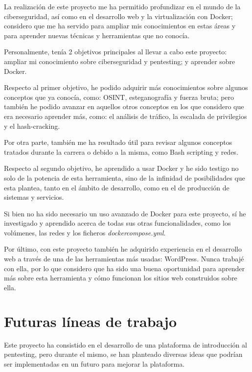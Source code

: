         La realización de este proyecto me ha permitido profundizar en el mundo de la ciberseguridad, así como en el desarrollo web y la virtualización con Docker; considero que me ha servido para ampliar mis conocimientos en estas áreas y para aprender nuevas técnicas y herramientas que no conocía.
    
        Personalmente, tenía 2 objetivos principales al llevar a cabo este proyecto: ampliar mi conocimiento sobre ciberseguridad y pentesting; y aprender sobre Docker.

        Respecto al primer objetivo, he podido adquirir más conocimientos sobre algunos conceptos que ya conocía, como: OSINT, esteganografía y fuerza bruta; pero también he podido avanzar en aquellos otros conceptos en los que considero que era necesario aprender más, como: el análisis de tráfico, la escalada de privilegios y el hash-cracking.
        
        Por otra parte, también me ha resultado útil para revisar algunos conceptos tratados durante la carrera o debido a la misma, como Bash scripting y redes.

        Respecto al segundo objetivo, he aprendido a usar Docker y he sido testigo no solo de la potencia de esta herramienta, sino de la infinidad de posibilidades que esta plantea, tanto en el ámbito de desarrollo, como en el de producción de sistemas y servicios.

        Si bien no ha sido necesario un uso avanzado de Docker para este proyecto, sí he investigado y aprendido acerca de todas sus otras funcionalidades, como los volúmenes, las redes y los ficheros \textit{dockercompose.yml}.

        Por último, con este proyecto también he adquirido experiencia en el desarrollo web a través de una de las herramientas más usadas: WordPress. Nunca trabajé con ella, por lo que considero que ha sido una buena oportunidad para aprender más sobre esta herramienta y cómo funcionan los sitios web construidos sobre ella.

    
    \section{Futuras líneas de trabajo}
        \label{sec:futuras-lineas-trabajo}

        Este proyecto ha consistido en el desarrollo de una plataforma de introducción al pentesting, pero durante el mismo, se han planteado diversas ideas que podrían ser implementadas en un futuro para mejorar la plataforma.

